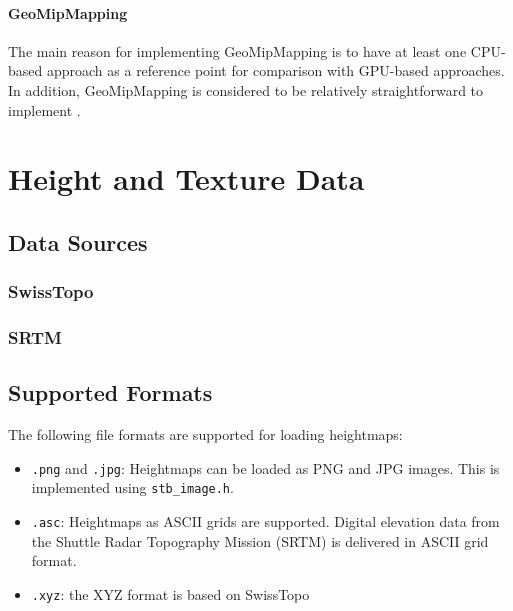 \paragraph{GeoMipMapping} The main reason for implementing GeoMipMapping is to have at least one CPU-based approach
as a reference point for comparison with GPU-based approaches.
In addition, GeoMipMapping is considered to be relatively straightforward to implement \cite[p.~79]{focuson3dterrainprogramming}.


\section{Height and Texture Data}
\subsection{Data Sources}
\subsubsection{SwissTopo}

\subsubsection{SRTM}

\subsection{Supported Formats}
The following file formats are supported for loading heightmaps:
\begin{itemize}
  \item \texttt{.png} and \texttt{.jpg}: Heightmaps can be loaded as PNG and JPG images. This is implemented using \texttt{stb\_image.h}.
  \item \texttt{.asc}: Heightmaps as ASCII grids are supported. Digital elevation data from the Shuttle Radar Topography Mission (SRTM) is delivered in ASCII grid format.
  \item \texttt{.xyz}: the XYZ format is based on SwissTopo
\end{itemize}


